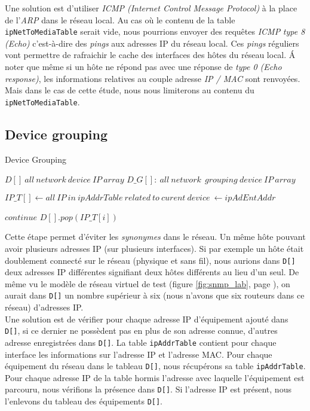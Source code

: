 Une solution est d'utiliser \emph{ICMP (Internet Control Message Protocol)} à la place de l'\emph{ARP} dans le réseau local. Au cas où le contenu de la table \texttt{ipNetToMediaTable} serait vide, nous pourrions envoyer des requêtes \emph{ICMP} \emph{type 8 (Echo)} c'est-à-dire des \emph{pings} aux adresses IP du réseau local. Ces \emph{pings} réguliers vont permettre de rafraichir le cache des interfaces des hôtes du réseau local. \'A noter que même si un hôte ne répond pas avec une réponse de \emph{type 0 (Echo response)}, les informations relatives au couple adresse \emph{IP / MAC} sont renvoyées. Mais dans le cas de cette étude, nous nous limiterons au contenu du \texttt{ipNetToMediaTable}.

\subsection{Device grouping}
\begin{center}
\begin{algorithm}
\caption{Device Grouping}
\label{device_grouping}
\begin{algorithmic}[1]
\Require $D[] ~ all~ network~ device~ IP~array$
\Ensure $D\_G[]:~ all~ network~ ~grouping~device~ IP~array$

  \State $IP\_T[] \gets all ~IP~ in~ ipAddrTable~ related~ to~ curent~ device~ \gets ipAdEntAddr$
   
     \State $continue$
    \Else
      \State $D[].pop(IP\_T[i])$
     \EndIf
    \EndIf
    
   \EndFor
 \EndFor

   
    
\EndFunction

\end{algorithmic}
\end{algorithm}
\end{center}
Cette étape permet d'éviter les \emph{synonymes} dans le réseau. Un même hôte pouvant avoir plusieurs adresses IP (sur plusieurs interfaces). Si par exemple un hôte était doublement connecté sur le réseau (physique et sans fil), nous aurions dans \texttt{D[]}  deux adresses IP différentes signifiant deux hôtes différents au lieu d'un seul. De même vu le modèle de réseau virtuel de test (figure \ref{fig:snmp_lab}, page \pageref{fig:snmp_lab}), on aurait dans \texttt{D[]} un nombre supérieur à six (nous n'avons que six routeurs dans ce réseau) d'adresses IP.\\
Une solution est de vérifier pour chaque adresse IP d'équipement ajouté dans \texttt{D[]}, si ce dernier ne possèdent pas  en plus de son adresse connue, d'autres adresse enregistrées dans \texttt{D[]}. La table \texttt{ipAddrTable} contient pour chaque interface les informations sur l'adresse IP et l'adresse MAC. Pour chaque  équipement du réseau dans le tableau \texttt{D[]}, nous récupérons sa table \texttt{ipAddrTable}. Pour chaque adresse IP de la table hormis l'adresse avec laquelle l'équipement est parcouru, nous vérifions la présence dans \texttt{D[]}. Si l'adresse IP est présent, nous l'enlevons du tableau des équipements \texttt{D[]}.

